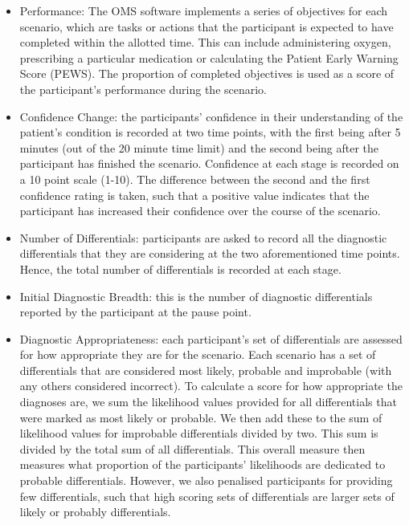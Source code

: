\documentclass[a4paper, nobind]{templates/ociamthesis}
\providecommand{\tightlist}{%
  \setlength{\itemsep}{0pt}\setlength{\parskip}{0pt}}
\begin{document}
\begin{itemize}
\tightlist
\item
  Performance: The OMS software implements a series of objectives for each scenario, which are tasks or actions that the participant is expected to have completed within the allotted time. This can include administering oxygen, prescribing a particular medication or calculating the Patient Early Warning Score (PEWS). The proportion of completed objectives is used as a score of the participant's performance during the scenario.
\item
  Confidence Change: the participants' confidence in their understanding of the patient's condition is recorded at two time points, with the first being after 5 minutes (out of the 20 minute time limit) and the second being after the participant has finished the scenario. Confidence at each stage is recorded on a 10 point scale (1-10). The difference between the second and the first confidence rating is taken, such that a positive value indicates that the participant has increased their confidence over the course of the scenario.
\item
  Number of Differentials: participants are asked to record all the diagnostic differentials that they are considering at the two aforementioned time points. Hence, the total number of differentials is recorded at each stage.
\item
  Initial Diagnostic Breadth: this is the number of diagnostic differentials reported by the participant at the pause point.
\item
  Diagnostic Appropriateness: each participant's set of differentials are assessed for how appropriate they are for the scenario. Each scenario has a set of differentials that are considered most likely, probable and improbable (with any others considered incorrect). To calculate a score for how appropriate the diagnoses are, we sum the likelihood values provided for all differentials that were marked as most likely or probable. We then add these to the sum of likelihood values for improbable differentials divided by two. This sum is divided by the total sum of all differentials. This overall measure then measures what proportion of the participants' likelihoods are dedicated to probable differentials. However, we also penalised participants for providing few differentials, such that high scoring sets of differentials are larger sets of likely or probably differentials.
\end{itemize}
\end{document}
